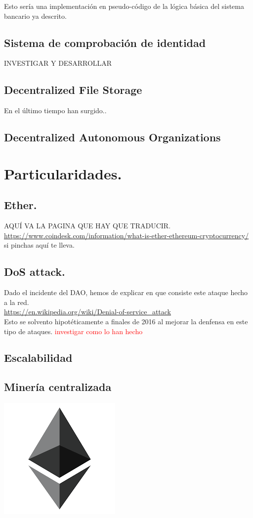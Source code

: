 \documentclass[11pt,a4paper]{article}
\begin{document}
Esto sería una implementación en pseudo-código de la lógica básica del sistema bancario ya descrito.


\subsection{Sistema de comprobación de identidad}

INVESTIGAR Y DESARROLLAR

\subsection{Decentralized File Storage}

En el último tiempo han surgido..


\subsection{Decentralized Autonomous Organizations}
\label{sec:dao}

\section{Particularidades.}

\subsection{Ether.}
\label{sec:ether}

AQUÍ VA LA PAGINA QUE HAY QUE TRADUCIR.	\\
\url{https://www.coindesk.com/information/what-is-ether-ethereum-cryptocurrency/}	\\
si pinchas aquí te lleva.

\subsection{DoS attack.}
Dado el incidente del DAO, hemos de explicar en que consiste este ataque hecho a la red.		 \\
\url{https://en.wikipedia.org/wiki/Denial-of-service_attack}\\
Esto se solvento hipotéticamente a finales de 2016 al mejorar la denfensa en este tipo de ataques. \textcolor{red}{investigar como lo han hecho}

\subsection{Escalabilidad}
\subsection{Minería centralizada}

\newpage
\begin{center}
  \includegraphics[scale=.42]{images/logo.png}
\end{center}

\tableofcontents
\end{document}
